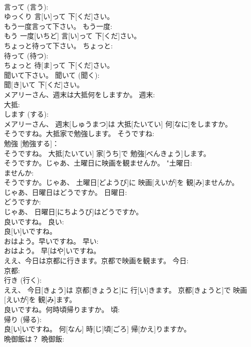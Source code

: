 \documentclass[8pt]{extreport}
\begin{document}
\begin{CJK}{UTF8}{min}
\\	言って (言う): 
\\	ゆっくり 言[い]って 下[くだ]さい。		
\\	もう一度言って下さい。	もう一度: 
\\	もう 一度[いちど] 言[い]って 下[くだ]さい。		
\\	ちょっと待って下さい。	ちょっと: 
\\	待って (待つ): 
\\	ちょっと 待[ま]って 下[くだ]さい。		
\\	聞いて下さい。	聞いて (聞く): 
\\	聞[き]いて 下[くだ]さい。		
\\	メアリーさん、週末は大抵何をしますか。	週末: 
\\	大抵: 
\\	します (する): 
\\	メアリーさん、 週末[しゅうまつ]は 大抵[たいてい] 何[なに]をしますか。		
\\	そうですね。大抵家で勉強します。	そうですね: 
\\	勉強 [勉強する]：
\\	そうですね。 大抵[たいてい] 家[うち]で 勉強[べんきょう]します。		
\\	そうですか。じゃあ、土曜日に映画を観ませんか。	"土曜日: 
\\	ませんか: 
\\	そうですか。じゃあ、 土曜日[どようび]に 映画[えいが]を 観[み]ませんか。		
\\	じゃあ、日曜日はどうですか。	日曜日: 
\\	どうですか: 
\\	じゃあ、 日曜日[にちようび]はどうですか。		
\\	良いですね。	良い: 
\\	良[い]いですね。		
\\	おはよう。早いですね。	早い: 
\\	おはよう。 早[はや]いですね。		
\\	ええ、今日は京都に行きます。京都で映画を観ます。	今日: 
\\	京都: 
\\	行き (行く): 
\\	ええ、 今日[きょう]は 京都[きょうと]に 行[い]きます。 京都[きょうと]で 映画[えいが]を 観[み]ます。		
\\	良いですね。何時頃帰りますか。	頃: 
\\	帰り (帰る): 
\\	良[い]いですね。 何[なん] 時[じ]頃[ごろ] 帰[かえ]りますか。		
\\	晩御飯は？	晩御飯: 

\end{CJK}
\end{document}
